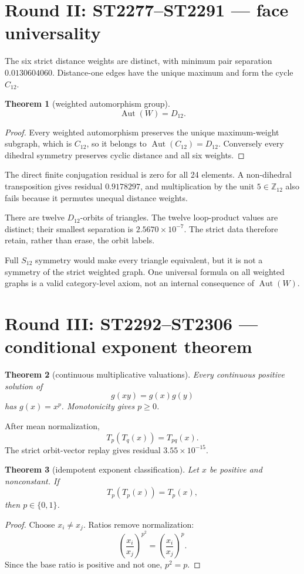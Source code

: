 \documentclass[11pt,a4paper]{article}
\newtheorem{theorem}{Theorem}\newtheorem{proposition}{Proposition}
\begin{document}
\section{Round II: ST2277--ST2291 --- face universality}

The six strict distance weights are distinct, with minimum pair separation
\(0.0130604060\).  Distance-one edges have the unique maximum and form the
cycle \(C_{12}\).

\begin{theorem}[weighted automorphism group]
\[
 \operatorname{Aut}(W)=D_{12}.
\]
\end{theorem}
\begin{proof}
Every weighted automorphism preserves the unique maximum-weight subgraph,
which is \(C_{12}\), so it belongs to
\(\operatorname{Aut}(C_{12})=D_{12}\).  Conversely every dihedral symmetry
preserves cyclic distance and all six weights.
\end{proof}

The direct finite conjugation residual is zero for all 24 elements.  A
non-dihedral transposition gives residual \(0.9178297\), and multiplication by
the unit \(5\in\mathbb Z_{12}\) also fails because it permutes unequal distance
weights.

There are twelve \(D_{12}\)-orbits of triangles.  The twelve loop-product
values are distinct; their smallest separation is
\(2.5670\times10^{-7}\).  The strict data therefore retain, rather than erase,
the orbit labels.

Full \(S_{12}\) symmetry would make every triangle equivalent, but it is not a
symmetry of the strict weighted graph.  One universal formula on all weighted
graphs is a valid category-level axiom, not an internal consequence of
\(\operatorname{Aut}(W)\).

\section{Round III: ST2292--ST2306 --- conditional exponent theorem}

\begin{theorem}[continuous multiplicative valuations]
Every continuous positive solution of
\[
 g(xy)=g(x)g(y)
\]
has \(g(x)=x^p\).  Monotonicity gives \(p\geq0\).
\end{theorem}

After mean normalization,
\[
 T_p(T_q(x))=T_{pq}(x).
\]
The strict orbit-vector replay gives residual \(3.55\times10^{-15}\).

\begin{theorem}[idempotent exponent classification]
Let \(x\) be positive and nonconstant.  If
\[
 T_p(T_p(x))=T_p(x),
\]
then \(p\in\{0,1\}\).
\end{theorem}
\begin{proof}
Choose \(x_i\neq x_j\).  Ratios remove normalization:
\[
 \left(\frac{x_i}{x_j}\right)^{p^2}
 =\left(\frac{x_i}{x_j}\right)^p.
\]
Since the base ratio is positive and not one, \(p^2=p\).
\end{proof}
\end{document}
